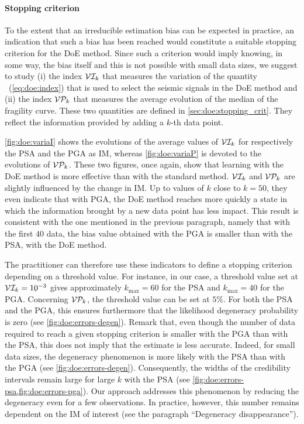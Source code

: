     \paragraph{{Stopping criterion}} {To the extent that an irreducible estimation bias can be expected in practice, an indication that such a bias has been reached would constitute a suitable stopping criterion for the DoE method. Since such a criterion would imply knowing, in some way, the bias itself and this is not possible with small data sizes, we suggest to study (i) the index $\mathcal{V}\mathcal{I}_k$ that measures the variation of the  quantity ~(\ref{eq:doe:index}) that is used to select the seismic signals in the DoE method and (ii) the index $\mathcal{V}\mathcal{P}_k$ that measures the average evolution of the median of the fragility curve. These two quantities are defined in \cref{sec:doe:stopping_crit}. They reflect the information provided by adding a $k$-th data point. 

     \cref{fig:doe:variaI} shows the evolutions of the average values of $\mathcal{V}\mathcal{I}_k$ for respectively the PSA and the PGA as IM, whereas  \cref{fig:doe:variaP} is devoted to the evolutions of $\mathcal{V}\mathcal{P}_k$. These two figures, once again, show that learning with the DoE method is more effective than with the standard method. $\mathcal{V}\mathcal{I}_k$ and $\mathcal{V}\mathcal{P}_k$ are slightly influenced by the change in IM. Up to values of $k$ close to $k=50$, they even indicate that with PGA, the DoE method reaches more quickly a state in which the information brought by a new data point has less impact. This result is consistent with the one mentioned in the previous paragraph, namely that with the first $40$ data, the bias value obtained with the PGA is smaller than with the PSA, with the DoE method.
    
    The practitioner can therefore use these indicators to define a stopping criterion depending on a threshold value. For instance, in our case, a threshold value set at $\mathcal{V}\mathcal{I}_k = 10^{-3}$ gives approximately $k_{\max} = 60$ for the PSA and $k_{\max} = 40$ for the PGA. Concerning $\mathcal{V}\mathcal{P}_k$, the threshold value can be set at $5 \% $. For both the PSA and the PGA, this ensures furthermore that the likelihood degeneracy probability is zero (see  \cref{fig:doe:errors-degen}). 
    Remark that, even though the number of data required to reach a given stopping criterion is smaller with the PGA than with the PSA, this does not imply that the estimate is less accurate. Indeed, for small data sizes, the degeneracy phenomenon is more likely with the PSA than with the PGA (see  \cref{fig:doe:errors-degen}). Consequently, the widths of the credibility intervals remain large for large $k$ with the PSA (see \cref{fig:doe:errors-psa,fig:doe:errors-pga}). Our approach addresses this phenomenon by reducing the degeneracy even for a few observations. In practice, however, this number remains dependent on the IM of interest (see the paragraph ``Degeneracy disappearance'').
    
    }
        
